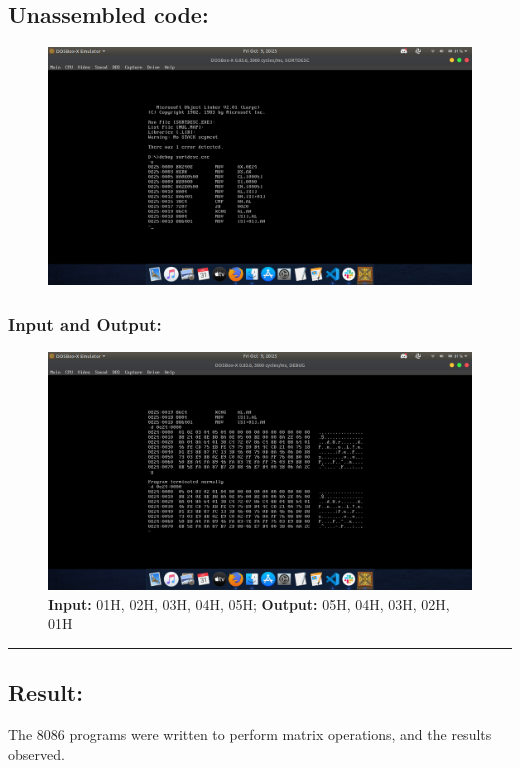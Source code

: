 \documentclass[10pt,a4paper]{article}
\begin{document}
\begin{flushleft}
\subsection*{\textbf{Unassembled code:}}
\begin{figure}[h]
    \centering
    \includegraphics[trim = 100mm 60mm 200mm 120mm, clip, width = \textwidth]{Pics/SDUS.png}
\end{figure}
\subsubsection*{\textbf{Input and Output:}}
\begin{figure}[h]
    \centering
    \includegraphics[trim = 100mm 60mm 100mm 80mm, clip, width = \textwidth]{Pics/SDIO.png}
    \caption{ \textbf{Input:} 01H, 02H, 03H, 04H, 05H; \newline \hspace{1cm}
              \textbf{Output:} 05H, 04H, 03H, 02H, 01H}
\end{figure}
\hrule
\subsection*{\textbf{Result:}}
The 8086 programs were written to perform matrix operations, and the results observed.
\end{flushleft}
\end{document}
